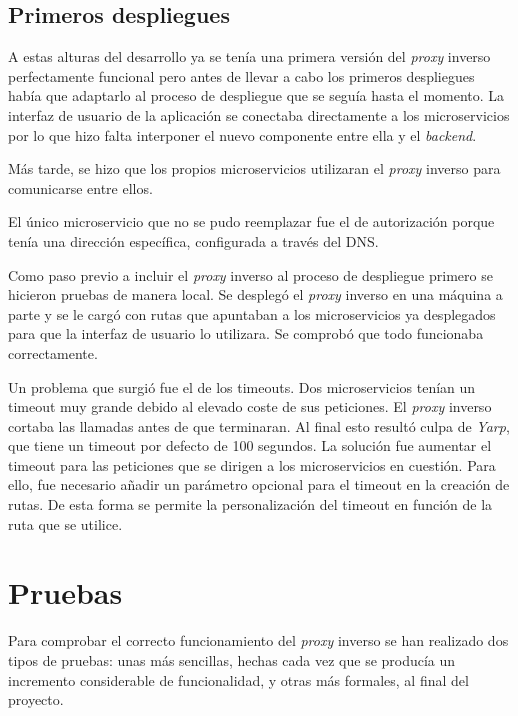 \documentclass[11pt,spanish,listoffigures]{tfgetsinf}
\begin{document}
\subsection{Primeros despliegues}

A estas alturas del desarrollo ya se tenía una primera versión del \emph{proxy} inverso perfectamente funcional pero antes de llevar a cabo los primeros despliegues había que adaptarlo al proceso de despliegue que se seguía hasta el momento. La interfaz de usuario de la aplicación se conectaba directamente a los microservicios por lo que hizo falta interponer el nuevo componente entre ella y el \emph{backend}.

Más tarde, se hizo que los propios microservicios utilizaran el \emph{proxy} inverso para comunicarse entre ellos.

El único microservicio que no se pudo reemplazar fue el de autorización porque tenía una dirección específica, configurada a través del DNS.

Como paso previo a incluir el \emph{proxy} inverso al proceso de despliegue primero se hicieron pruebas de manera local. Se desplegó el \emph{proxy} inverso en una máquina a parte y se le cargó con rutas que apuntaban a los microservicios ya desplegados para que la interfaz de usuario lo utilizara. Se comprobó que todo funcionaba correctamente.

Un problema que surgió fue el de los timeouts. Dos microservicios tenían un timeout muy grande debido al elevado coste de sus peticiones. El \emph{proxy} inverso cortaba las llamadas antes de que terminaran. Al final esto resultó culpa de \emph{Yarp}, que tiene un timeout por defecto de 100 segundos. La solución fue aumentar el timeout para las peticiones que se dirigen a los microservicios en cuestión. Para ello, fue necesario añadir un parámetro opcional para el timeout en la creación de rutas. De esta forma se permite la personalización del timeout en función de la ruta que se utilice.


\section{Pruebas}

Para comprobar el correcto funcionamiento del \emph{proxy} inverso se han realizado dos tipos de pruebas: unas más sencillas, hechas cada vez que se producía un incremento considerable de funcionalidad, y otras más formales, al final del proyecto.
\end{document}

